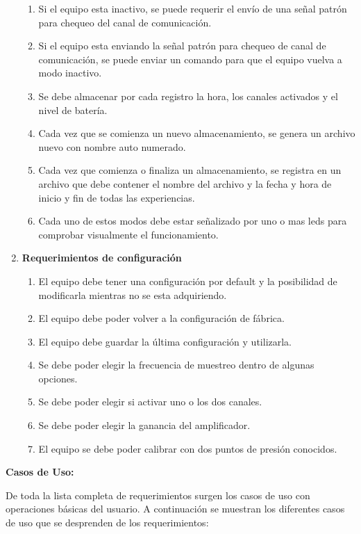 \begin{enumerate}
\begin{enumerate}[label*=\arabic*.]
		\item Si el equipo esta inactivo, se puede requerir el envío de una señal patrón para chequeo del canal de comunicación.
		\item Si el equipo esta enviando la señal patrón para chequeo de canal de comunicación, se puede enviar un comando para que el equipo vuelva a modo inactivo.
		\item Se debe almacenar por cada registro la hora, los canales activados y el nivel de batería.
		\item Cada vez que se comienza un nuevo almacenamiento, se genera un archivo nuevo con nombre auto numerado.
		\item Cada vez que comienza o finaliza un almacenamiento, se registra en un archivo que debe contener el nombre del archivo y la fecha y hora de inicio y fin de todas las experiencias.
		\item Cada uno de estos modos debe estar señalizado por uno o mas leds para comprobar visualmente el funcionamiento.
	\end{enumerate}
	
	\item \textbf{Requerimientos de configuración}
	
	\begin{enumerate} [label*=\arabic*.]
		\item El equipo debe tener una configuración por default y la posibilidad de modificarla mientras no se esta adquiriendo.
		\item El equipo debe poder volver a la configuración de fábrica.
		\item El equipo debe guardar la última configuración y utilizarla.
		\item Se debe poder elegir la frecuencia de muestreo dentro de algunas opciones.
		\item Se debe poder elegir si activar uno o los dos canales.
		\item Se debe poder elegir la ganancia del amplificador.
		\item El equipo se debe poder calibrar con dos puntos de presión conocidos.		
	\end{enumerate}


\end{enumerate}

\textbf{Casos de Uso:}

De toda la lista completa de requerimientos surgen los casos de uso con operaciones básicas del usuario. A continuación se muestran los diferentes casos de uso que se desprenden de los requerimientos:

